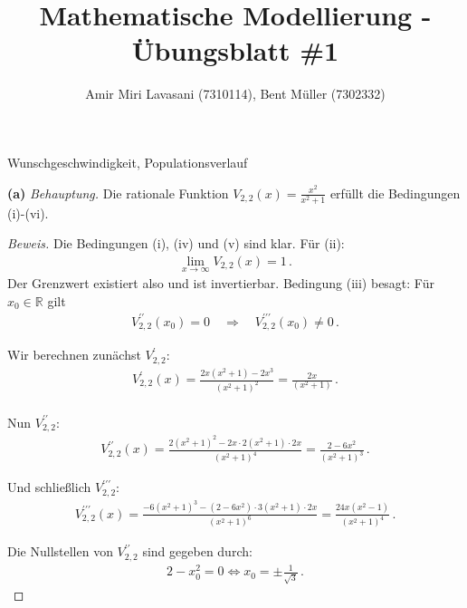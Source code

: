 \documentclass[10pt]{article}
\newcommand{\R}{\mathbb{R}}
\newcommand{\beh}{\textit{Behauptung. }}
\newenvironment{Aufgabe}[2][Aufgabe]{\begin{trivlist}
\item[\hskip \labelsep {\bfseries #1}\hskip \labelsep {\bfseries #2.}]}{\end{trivlist}}
\begin{document}
 
\title{ \textbf{Mathematische Modellierung - Übungsblatt \#1} }

\author{Amir Miri Lavasani (7310114), Bent Müller (7302332)} \maketitle

 
\begin{Aufgabe}{2}
    Wunschgeschwindigkeit, Populationsverlauf
\end{Aufgabe}

\textbf{(a)} \beh Die rationale Funktion $V_{2,2}(x) = \frac{x^2}{x^2 + 1}$ erfüllt die Bedingungen (i)-(vi).
\begin{proof}[Beweis]
    Die Bedingungen (i), (iv) und (v) sind klar. Für (ii): 
    \begin{align*}
        \lim_{x\to\infty} V_{2,2}(x) = 1 \,. 
    \end{align*}
    Der Grenzwert existiert also und ist invertierbar. 
    Bedingung (iii) besagt: Für $x_0\in\R$ gilt
    \begin{align*}
        V_{2,2}^{\prime\prime}(x_0) = 0 \quad\Longrightarrow\quad V_{2,2}^{\prime\prime\prime}(x_0) \neq 0\,.
    \end{align*}

    Wir berechnen zunächst $V_{2,2}^{\prime}$: 
    \begin{align*}
        V_{2,2}^{\prime}(x) = \frac{2x(x^2+1)-2x^3}{(x^2+1)^2} = \frac{2x}{(x^2+1)} \,. \\
    \end{align*}

    Nun $V_{2,2}^{\prime\prime}$:
    \begin{align*}
        V_{2,2}^{\prime\prime}(x) = \frac{2(x^2+1)^2 - 2x\cdot 2 (x^2+1)\cdot 2x}{(x^2+1)^4} 
                                  = \frac{2-6x^2}{(x^2+1)^3} \,. 
    \end{align*}
    
    Und schließlich $V_{2,2}^{\prime\prime\prime}$:
    \begin{align*}
        V_{2,2}^{\prime\prime\prime}(x) = \frac{-6(x^2+1)^3 - (2-6x^2)\cdot 3(x^2 + 1)\cdot 2x}{(x^2+1)^6} 
                                        = \frac{24x(x^2-1)}{(x^2+1)^4} \,.
    \end{align*}

    Die Nullstellen von $V_{2,2}^{\prime\prime}$ sind gegeben durch:
    \begin{align*}
        2 - x_0^2 = 0 \Longleftrightarrow x_0 = \pm\frac{1}{\sqrt{3}} \,.
    \end{align*}


\end{proof}
\end{document}
